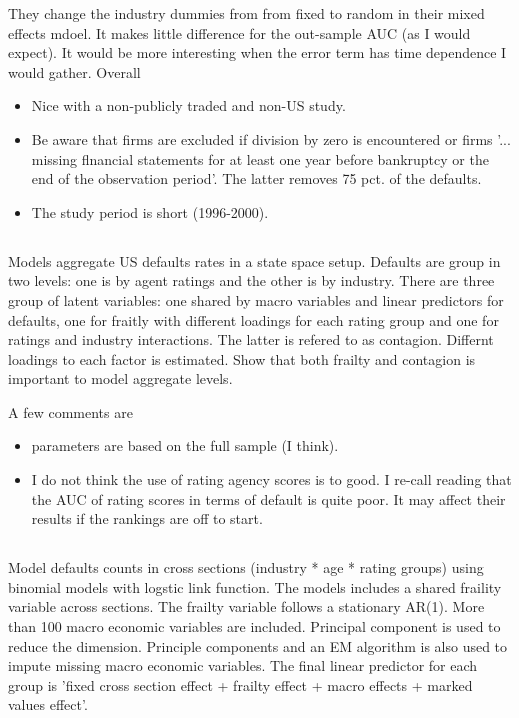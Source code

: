 \documentclass{article}
\newcommand{\seccite}[1]{\subsection{\cite{#1}}\label{sec:#1}}
\begin{document}
They change the industry dummies from from fixed to random in their mixed effects mdoel. It makes little difference for the out-sample AUC (as I would expect). It would be more interesting when the error term has time dependence I would gather. Overall 

\begin{itemize}
  \item Nice with a non-publicly traded and non-US study.
  \item Be aware that firms are excluded if division by zero is encountered or firms '... missing flnancial statements for at least one year before bankruptcy or the end of the observation period'. The latter removes 75 pct. of the defaults.
  \item The study period is short (1996-2000).
\end{itemize}


\seccite{koopman10}
Models aggregate US defaults rates in a state space setup. Defaults are group in two levels: one is by agent ratings and the other is by industry. There are three group of latent variables: one shared by macro variables and linear predictors for defaults, one for fraitly with different loadings for each rating group and one for ratings and industry interactions. The latter is refered to as contagion. Differnt loadings to each factor is estimated. Show that both frailty and contagion is important to model aggregate levels.

A few comments are

\begin{itemize}
  \item parameters are based on the full sample (I think).
  \item I do not think the use of rating agency scores is to good. I re-call reading that the AUC of rating scores in terms of default is quite poor. It may affect their results if the rankings are off to start.
\end{itemize}



\seccite{koopman11}
Model defaults counts in cross sections (industry * age * rating groups)  using binomial models with logstic link function. The models includes a shared fraility variable across sections. The frailty variable follows a stationary AR(1). More than 100 macro economic variables are included. Principal component is used to reduce the dimension. Principle components and an EM algorithm is also used to impute missing macro economic variables. The final linear predictor for each group is 'fixed cross section effect + frailty effect + macro effects + marked values effect'.
\end{document}
